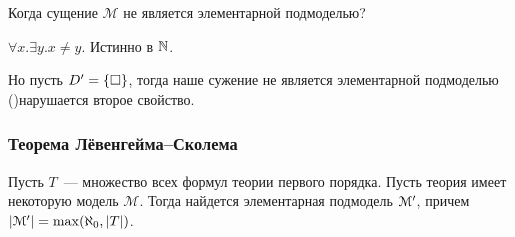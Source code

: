 \begin{example}
    Когда сущение $\mathcal{M}$ не является элементарной подмоделью?

    $\forall x.\exists y.x \neq y$. Истинно в $\mathbb{N}$.

    Но пусть $D^{\prime} = \{ \square \}$, тогда наше сужение не является элементарной подмоделью ()нарушается второе свойство.
\end{example}
\subsubsection{Теорема Лёвенгейма--Сколема}
\begin{theorem}
    Пусть $T$~--- множество всех формул теории первого порядка. Пусть теория имеет некоторую модель $\mathcal M$. Тогда найдется элементарная подмодель $\mathcal{M}^{\prime}$, причем $\left| \mathcal M^{\prime} \right| = \max(\aleph_0,|T|)$.
\end{theorem}


